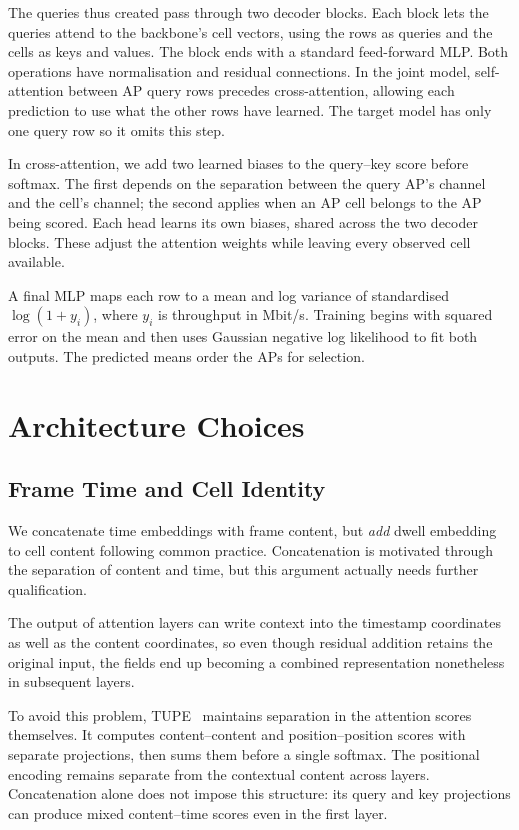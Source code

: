 \documentclass[conference]{IEEEtran}
\begin{document}
The queries thus created pass through two decoder blocks. Each block lets the queries 
attend to the backbone's cell vectors, using the rows as queries and the cells as keys
and values. The block ends with a standard feed-forward MLP. Both operations have normalisation
and residual connections. In the joint model, self-attention between AP query rows
precedes cross-attention, allowing each prediction to use what the other rows
have learned. The target model has only one query row so it omits this step.

In cross-attention, we add two learned biases to the query--key score before
softmax. The first depends on the separation between the query AP's channel
and the cell's channel; the second applies when an AP cell belongs to the AP
being scored. Each head learns its own biases, shared across the two decoder
blocks. These adjust the attention weights while leaving every observed cell
available.

A final MLP maps each row to a mean and log variance of standardised
$\log(1+y_i)$, where $y_i$ is throughput in Mbit/s. Training begins with squared
error on the mean and then uses Gaussian negative log likelihood to fit both
outputs. The predicted means order the APs for selection.

\section{Architecture Choices}
\label{sec:choices}

\subsection{Frame Time and Cell Identity}

We concatenate time embeddings with frame content, but \textit{add} dwell embedding to
cell content following common practice. Concatenation is motivated through the separation of
content and time, but this argument actually needs further qualification. 

The output of attention layers can write context into the timestamp coordinates 
as well as the content coordinates, so even though residual addition retains 
the original input, the fields end up becoming a combined representation nonetheless 
in subsequent layers.

To avoid this problem, TUPE~\cite{ke2021tupe} maintains separation in the 
attention scores themselves. It computes content--content and position--position 
scores with separate projections, then sums them before a single softmax.
The positional encoding remains separate from the contextual content across layers. 
Concatenation alone does not impose this structure: its query and key projections can produce
mixed content--time scores even in the first layer.
\end{document}
